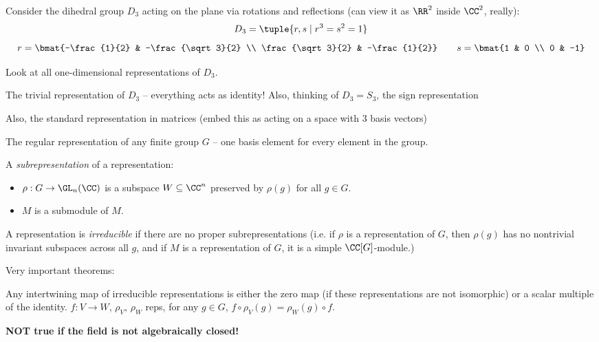 \documentclass[12pt]{article}
\begin{document}
\begin{example*}
  Consider the dihedral group $D_3$ acting on the plane via rotations and
  reflections (can view it as $\RR^2$ inside $\CC^2$, really):
  \[
    D_3 = \tuple{r, s \mid r^3 = s^2 = 1}
  \]
  \[
    r = \bmat{-\frac{1}{2} & -\frac{\sqrt 3}{2} \\ \frac{\sqrt 3}{2} &
    -\frac{1}{2}} \qquad s = \bmat{1 & 0 \\ 0 & -1}
  \] 
\end{example*}

\begin{example*}
  Look at all one-dimensional representations of $D_3$. 

  The trivial representation of $D_3$ -- everything acts as identity! 
  Also, thinking of $D_3 = S_3$, the sign representation 

  Also, the standard representation in matrices (embed this as acting on a space with
  3 basis vectors)
\end{example*}

\begin{example*}
  The regular representation of any finite group $G$ -- one basis element for
  every element in the group. 
\end{example*}

\begin{definition*}
  A \emph{subrepresentation} of a representation:
  \begin{itemize}
    \item $\rho : G \to \GL_n(\CC)$ is a subspace $W \subseteq \CC^n$ preserved
      by $\rho(g)$ for all $g \in G$.
    \item $M$ is a submodule of $M$. 
\end{itemize}  
\end{definition*}

\begin{definition*}
  A representation is \emph{irreducible} if there are no proper
  subrepresentations (i.e. if $\rho$ is a representation of $G$, then $\rho(g)$
  has no nontrivial invariant subspaces across all $g$, and if $M$ is a representation of $G$, it is a simple
  $\CC[G]$-module.) 
\end{definition*}

Very important theorems:
\begin{theorem*}
  Any intertwining map of irreducible representations is either the zero map (if
  these representations are not isomorphic) or a scalar multiple of the identity.
  $f : V \to W$, $\rho_V$, $\rho_W$ reps, for any $g \in G$, $f \circ \rho_V(g)
  = \rho_W(g) \circ f$. 

  \noindent\textbf{NOT true if the field is not algebraically closed!}
\end{theorem*}
\end{document}

